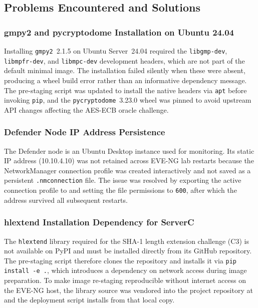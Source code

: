 \subsection{Problems Encountered and Solutions}

\subsubsection{gmpy2 and pycryptodome Installation on Ubuntu 24.04}

Installing \texttt{gmpy2}~2.1.5 on Ubuntu Server~24.04 required the
\texttt{libgmp-dev}, \texttt{libmpfr-dev}, and \texttt{libmpc-dev} development
headers, which are not part of the default minimal image. The installation failed
silently when these were absent, producing a wheel build error rather than an
informative dependency message. The pre-staging script was updated to install the
native headers via \texttt{apt} before invoking \texttt{pip}, and the
\texttt{pycryptodome}~3.23.0 wheel was pinned to avoid upstream API changes
affecting the AES-ECB oracle challenge.

\subsubsection{Defender Node IP Address Persistence}

The Defender node is an Ubuntu Desktop instance used for monitoring. Its static
IP address (10.10.4.10) was not retained across EVE-NG lab restarts because the
NetworkManager connection profile was created interactively and not saved as a
persistent \texttt{.nmconnection} file. The issue was resolved by exporting the
active connection profile to  and
setting the file permissions to \texttt{600}, after which the address survived
all subsequent restarts.

\subsubsection{hlextend Installation Dependency for ServerC}

The \texttt{hlextend} library required for the SHA-1 length extension challenge
(C3) is not available on PyPI and must be installed directly from its GitHub
repository. The pre-staging script therefore clones the repository and installs
it via \texttt{pip install -e .}, which introduces a dependency on network access
during image preparation. To make image re-staging reproducible without internet
access on the EVE-NG host, the library source was vendored into the project
repository at  and the
deployment script installs from that local copy.
